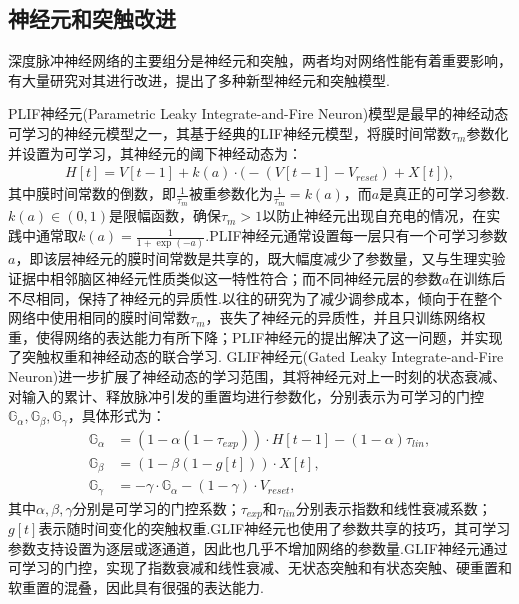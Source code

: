 \documentclass{SCIS2020cn}
\begin{document}



\subsection{神经元和突触改进}%
深度脉冲神经网络的主要组分是神经元和突触，两者均对网络性能有着重要影响，有大量研究对其进行改进，提出了多种新型神经元和突触模型.

PLIF神经元(Parametric Leaky Integrate-and-Fire Neuron)模型\cite{fang2021incorporating}是最早的神经动态可学习的神经元模型之一，其基于经典的LIF神经元模型，将膜时间常数$\tau_{m}$参数化并设置为可学习，其神经元的阈下神经动态为：
\begin{eqnarray}
	H[t] = V[t-1] + k(a)\cdot\Big(-(V[t-1] - V_{reset}) + X[t]\Big), \label{eq, plif charge}
\end{eqnarray}
其中膜时间常数的倒数，即$\frac{1}{\tau_{m}}$被重参数化为$\frac{1}{\tau_{m}}=k(a)$，而$a$是真正的可学习参数.$k(a)\in (0, 1)$是限幅函数，确保$\tau_{m} > 1$以防止神经元出现自充电的情况，在实践中通常取$k(a) = \frac{1}{1 + \exp(-a)}$.PLIF神经元通常设置每一层只有一个可学习参数$a$，即该层神经元的膜时间常数是共享的，既大幅度减少了参数量，又与生理实验证据中相邻脑区神经元性质类似这一特性符合；而不同神经元层的参数$a$在训练后不尽相同，保持了神经元的异质性.以往的研究为了减少调参成本，倾向于在整个网络中使用相同的膜时间常数$\tau_{m}$，丧失了神经元的异质性，并且只训练网络权重，使得网络的表达能力有所下降；PLIF神经元的提出解决了这一问题，并实现了突触权重和神经动态的联合学习.
GLIF神经元(Gated Leaky Integrate-and-Fire
Neuron)\cite{yao2022glif}进一步扩展了神经动态的学习范围，其将神经元对上一时刻的状态衰减、对输入的累计、释放脉冲引发的重置均进行参数化，分别表示为可学习的门控$\mathbb{G}_{\alpha}, \mathbb{G}_{\beta}, \mathbb{G}_{\gamma}$，具体形式为：
\begin{align}
	\mathbb{G}_{\alpha} &= (1 - \alpha (1 - \tau_{exp})) \cdot H[t-1] - (1 - \alpha)\tau_{lin}, \\
	\mathbb{G}_{\beta} &= (1 - \beta (1 - g[t])) \cdot X[t], \\
	\mathbb{G}_{\gamma} &= -\gamma \cdot \mathbb{G}_{\alpha} - (1 - \gamma) \cdot V_{reset},
\end{align}
其中$\alpha, \beta, \gamma$分别是可学习的门控系数；$\tau_{exp}$和$\tau_{lin}$分别表示指数和线性衰减系数；$g[t]$表示随时间变化的突触权重.GLIF神经元也使用了参数共享的技巧，其可学习参数支持设置为逐层或逐通道，因此也几乎不增加网络的参数量.GLIF神经元通过可学习的门控，实现了指数衰减和线性衰减、无状态突触和有状态突触、硬重置和软重置的混叠，因此具有很强的表达能力.
\end{document}
